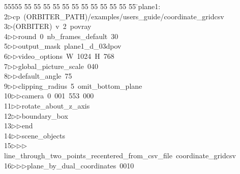%
%
\begin{tabbing}
55555 \= 55 \= 55 \= 55 \= 55 \= 55 \= 55 \= 55 \= 55 \= 55 \= 55 \= 55 \= 55 \= \>plane1:\\[0pt]
2\>$\triangleright$\>cp\ (ORBITER\_PATH)/examples/users\_guide/coordinate\_gridcsv\ \\[0pt]
3\>$\triangleright$\>(ORBITER)\ v\ 2\ povray\ \\[0pt]
4\>$\triangleright$\>$\triangleright$\>round\ 0\ nb\_frames\_default\ 30\ \\[0pt]
5\>$\triangleright$\>$\triangleright$\>output\_mask\ plane1\_d\_03dpov\ \\[0pt]
6\>$\triangleright$\>$\triangleright$\>video\_options\ W\ 1024\ H\ 768\ \\[0pt]
7\>$\triangleright$\>$\triangleright$\>global\_picture\_scale\ 040\ \\[0pt]
8\>$\triangleright$\>$\triangleright$\>default\_angle\ 75\ \\[0pt]
9\>$\triangleright$\>$\triangleright$\>clipping\_radius\ 5\ omit\_bottom\_plane\ \ \\[0pt]
10\>$\triangleright$\>$\triangleright$\>camera\ 0\ 001\ 553\ 000\ \ \\[0pt]
11\>$\triangleright$\>$\triangleright$\>rotate\_about\_z\_axis\ \\[0pt]
12\>$\triangleright$\>$\triangleright$\>boundary\_box\ \\[0pt]
13\>$\triangleright$\>$\triangleright$\>end\ \\[0pt]
14\>$\triangleright$\>$\triangleright$\>scene\_objects\ \\[0pt]
15\>$\triangleright$\>$\triangleright$\>$\triangleright$\>line\_through\_two\_points\_recentered\_from\_csv\_file\ coordinate\_gridcsv\ \\[0pt]
16\>$\triangleright$\>$\triangleright$\>$\triangleright$\>plane\_by\_dual\_coordinates\ 0010\ \\[0pt]

\end{tabbing}
